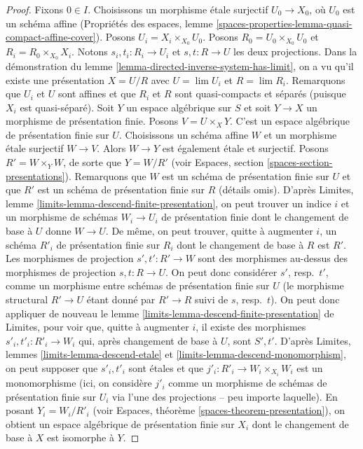 \begin{proof}
Fixons $0 \in I$. Choisissons un morphisme étale surjectif $U_0 \to X_0$, où
$U_0$ est un schéma affine (Propriétés des espaces, lemme
\ref{spaces-properties-lemma-quasi-compact-affine-cover}).
Posons $U_i = X_i \times_{X_0} U_0$. Posons $R_0 = U_0 \times_{X_0} U_0$ et
$R_i = R_0 \times_{X_0} X_i$. Notons $s_i, t_i : R_i \to U_i$ et
$s, t : R \to U$ les deux projections. Dans la démonstration du
lemme \ref{lemma-directed-inverse-system-has-limit}, on a
vu qu'il existe une présentation $X = U/R$ avec
$U = \lim U_i$ et $R = \lim R_i$. Remarquons que $U_i$ et $U$ sont affines et
que $R_i$ et $R$ sont quasi-compacts et séparés (puisque $X_i$ est
quasi-séparé). Soit $Y$ un espace algébrique sur $S$ et soit
$Y \to X$ un morphisme de présentation finie. Posons $V = U \times_X Y$.
C'est un espace algébrique de présentation finie sur $U$.
Choisissons un schéma affine $W$ et un morphisme étale surjectif $W \to V$.
Alors $W \to Y$ est également étale et surjectif. Posons $R' = W \times_Y W$,
de sorte que $Y = W/R'$ (voir Espaces, section \ref{spaces-section-presentations}).
Remarquons que $W$ est un schéma de présentation finie sur $U$ et que $R'$
est un schéma de présentation finie sur $R$ (détails omis).
D'après Limites, lemme \ref{limits-lemma-descend-finite-presentation},
on peut trouver un indice $i$ et un morphisme de schémas $W_i \to U_i$ de
présentation finie dont le changement de base à $U$ donne $W \to U$. De même,
on peut trouver, quitte à augmenter $i$, un schéma $R'_i$ de présentation
finie sur $R_i$ dont le changement de base à $R$ est $R'$.
Les morphismes de projection $s', t' : R' \to W$ sont des morphismes au-dessus des
morphismes de projection $s, t : R \to U$. On peut donc considérer $s'$,
resp.\ $t'$, comme un morphisme entre schémas de présentation finie sur
$U$ (le morphisme structural $R' \to U$ étant donné par $R' \to R$ suivi
de $s$, resp.\ $t$). On peut donc appliquer
de nouveau le lemme \ref{limits-lemma-descend-finite-presentation} de Limites,
pour voir que, quitte à augmenter $i$, il existe des
morphismes $s'_i, t'_i : R'_i \to W_i$ qui, après changement de base à $U$,
sont $S', t'$. D'après Limites, lemmes \ref{limits-lemma-descend-etale} et
\ref{limits-lemma-descend-monomorphism},
on peut supposer que $s'_i, t'_i$ sont étales et que
$j'_i : R'_i \to W_i \times_{X_i} W_i$ est un monomorphisme (ici, on
considère $j'_i$ comme un morphisme de schémas de présentation finie sur $U_i$ via
l'une des projections -- peu importe laquelle). En posant
$Y_i = W_i/R'_i$ (voir Espaces, théorème \ref{spaces-theorem-presentation}),
on obtient un espace algébrique de présentation finie
sur $X_i$ dont le changement de base à $X$ est isomorphe à $Y$.


\end{proof}
